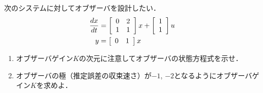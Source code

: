 \item
次のシステムに対してオブザーバを設計したい．
\begin{align}
	\frac{dx}{dt}
	&=	\bmatrix{cc}
			0 & 2 \\
			1 & 1
		\ematrix
		x
		+
		\bmatrix{c}
			1 \\
			1 
		\ematrix
		u
\nonumber \\
	y 
	&=	\bmatrix{cc}
			0 & 1 
		\ematrix
		x
\nonumber 
\end{align}

\begin{enumerate}

\item 
オブザーバゲイン$K$の次元に注意してオブザーバの状態方程式を示せ．
\vspace{6cm}

\item
オブザーバの極（推定誤差の収束速さ）が$-1$, $-2$となるようにオブザーバゲイン$K$を求めよ．
\vspace{12cm}

\end{enumerate}
